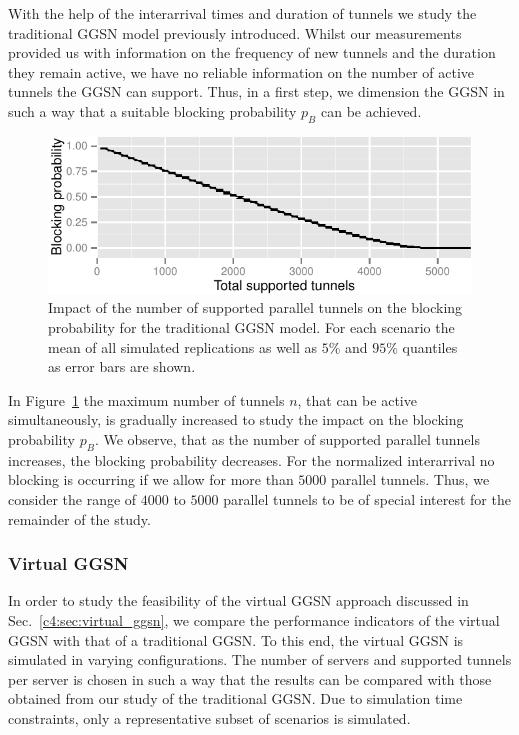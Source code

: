 With the help of the interarrival times and duration of tunnels we study the traditional \gls{GGSN} model previously introduced. Whilst our measurements provided us with information on the frequency of new tunnels and the duration they remain active, we have no reliable information on the number of active tunnels the \gls{GGSN} can support. Thus, in a first step, we dimension the \gls{GGSN} in such a way that a suitable blocking probability $p_B$ can be achieved.

\begin{figure}[htp]
  \centering
    \includegraphics[width=1.0\textwidth]{images/traditional-blocking.pdf}
  \caption{Impact of the number of supported parallel tunnels on the blocking probability for the traditional \gls{GGSN} model. For each scenario the mean of all simulated replications as well as $5\%$ and $95\%$ quantiles as error bars are shown.}
  \label{c4:fig:traditional_blocking}
\end{figure}

In Figure~\ref{c4:fig:traditional_blocking} the maximum number of tunnels $n$, that can be active simultaneously, is gradually increased to study the impact on the blocking probability $p_B$. We observe, that as the number of supported parallel tunnels increases, the blocking probability decreases. For the normalized interarrival no blocking is occurring if we allow for more than $5000$ parallel tunnels. Thus, we consider the range of $4000$ to $5000$ parallel tunnels to be of special interest for the remainder of the study.


\subsubsection{Virtual \texorpdfstring{\acrshort{GGSN}}{GGSN}}
\label{c4:sec:eval_ideal_virtual_ggsn}

In order to study the feasibility of the virtual \gls{GGSN} approach discussed in Sec.~\ref{c4:sec:virtual_ggsn}, we compare the performance indicators of the virtual \gls{GGSN} with that of a traditional \gls{GGSN}. To this end, the virtual \gls{GGSN} is simulated in varying configurations.
The number of servers and supported tunnels per server is chosen in such a way that the results can be compared with those obtained from our study of the traditional \gls{GGSN}. Due to simulation time constraints, only a representative subset of scenarios is simulated.

